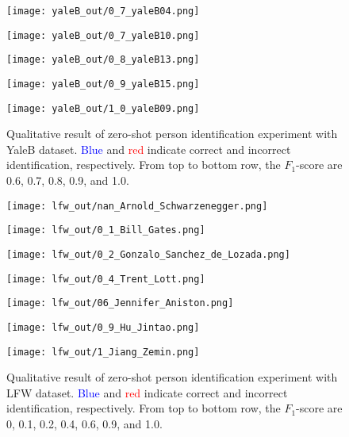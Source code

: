 \begin{figure*}[!t]
  \centering
  \begin{minipage}{2.0\columnwidth}  
    \centerline{\texttt{[image: yaleB\_out/0\_7\_yaleB04.png]}}  
    \centerline{\texttt{[image: yaleB\_out/0\_7\_yaleB10.png]}}  
    \centerline{\texttt{[image: yaleB\_out/0\_8\_yaleB13.png]}}  
    \centerline{\texttt{[image: yaleB\_out/0\_9\_yaleB15.png]}}
    \centerline{\texttt{[image: yaleB\_out/1\_0\_yaleB09.png]}}
  \end{minipage}
  \vspace{-2ex}
  \caption
    {
    \small
    Qualitative result of zero-shot person identification experiment with YaleB dataset.
    \textcolor{blue}{Blue} and \textcolor{red}{red} indicate correct and incorrect identification,
    respectively.
    From top to bottom row, 
    the {\small $F_1$}-score are 0.6, 0.7, 0.8, 0.9, and 1.0. 
    }
  \label{fig:results_identification_image_yaleB}
  \vspace{4ex}
% 
  \centering
  \begin{minipage}{2.0\columnwidth}  
    \centerline{\texttt{[image: lfw\_out/nan\_Arnold\_Schwarzenegger.png]}}
    \centerline{\texttt{[image: lfw\_out/0\_1\_Bill\_Gates.png]}}
    \centerline{\texttt{[image: lfw\_out/0\_2\_Gonzalo\_Sanchez\_de\_Lozada.png]}}  
    \centerline{\texttt{[image: lfw\_out/0\_4\_Trent\_Lott.png]}}
    \centerline{\texttt{[image: lfw\_out/06\_Jennifer\_Aniston.png]}}  
    \centerline{\texttt{[image: lfw\_out/0\_9\_Hu\_Jintao.png]}}  
    \centerline{\texttt{[image: lfw\_out/1\_Jiang\_Zemin.png]}}
  \end{minipage}
  \vspace{-2ex}
  \caption
    {
    \small
    Qualitative result of zero-shot person identification experiment with LFW dataset.
    \textcolor{blue}{Blue} and \textcolor{red}{red} indicate correct and incorrect identification,
    respectively.
    From top to bottom row, 
    the {\small $F_1$}-score are 0, 0.1, 0.2, 0.4, 0.6, 0.9, and 1.0.
    }
  \label{fig:results_identification_image_LFW}
\end{figure*}


